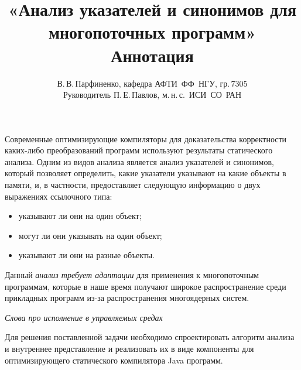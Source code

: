 \documentclass[12pt]{article}
\title{
  «Анализ указателей и синонимов для многопоточных программ»\\
  Аннотация
}
\author{
  В.\,В.\,Парфиненко, кафедра АФТИ~ФФ~НГУ, гр.\,7305\\
  Руководитель П.\,Е.\,Павлов, м.\,н.\,с.~ИСИ~СО~РАН
}
\begin{document}
  \maketitle

  \thispagestyle{empty}

    Современные оптимизирующие компиляторы для доказательства корректности
    каких-либо преобразований программ используют результаты
    статического анализа.
    Одним из видов анализа является анализ указателей и синонимов, который
    позволяет определить, какие указатели указывают на какие объекты в памяти,
    и, в частности, предоставляет следующую информацию о двух выражениях
    ссылочного типа:
    \begin{itemize}
      \item указывают ли они на один объект;
      \item могут ли они указывать на один объект;
      \item указывают ли они на разные объекты.
    \end{itemize}

    Данный \textit{анализ требует адаптации} для применения к многопоточным
    программам, которые в наше время получают широкое распространение среди
    прикладных программ из-за распространения многоядерных систем.

    \textit{Слова про исполнение в управляемых средах}

    Для решения поставленной задачи необходимо спроектировать алгоритм
    анализа и внутреннее представление и реализовать их в виде компоненты
    для оптимизирующего статического компилятора Java программ.
\end{document}
